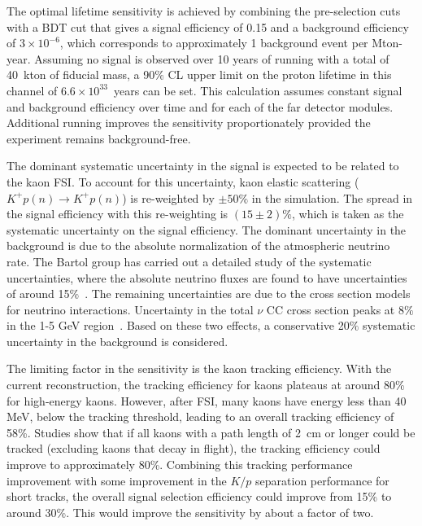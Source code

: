 The optimal lifetime sensitivity is achieved by combining the pre-selection cuts with a BDT cut that gives a signal efficiency of 0.15 and a background efficiency of $3\times 10^{-6}$, which corresponds to approximately 1 background event per Mton-year. Assuming no signal is observed over 10 years of running with a total of 40~kton of fiducial mass, a 90$\%$ CL upper limit on the proton lifetime in this channel of $6.6\times10^{33}$~years can be set. This calculation assumes constant signal and background efficiency over time and for each of the far detector modules.  Additional running improves the sensitivity proportionately provided the experiment remains background-free.

The dominant systematic uncertainty in the signal is expected to be related to the kaon FSI. To account for this uncertainty, kaon elastic scattering ($K^{+}p(n)\rightarrow K^{+}p(n)$) is re-weighted by $\pm 50\%$ in the simulation. The spread in the signal efficiency with this re-weighting is $(15\pm 2)\%$, which is taken as the  systematic uncertainty on the signal efficiency.
The dominant uncertainty in the background 
is due to the absolute normalization of the atmospheric neutrino rate. The Bartol group has carried out a detailed study of the systematic uncertainties, where the absolute neutrino fluxes are found to have uncertainties of around 15$\%$~\cite{Barr:2006it}.
The remaining uncertainties are due to the cross section models for neutrino interactions. Uncertainty in the total $\nu$ CC cross section peaks at 8$\%$ in the 1-5 GeV region~\cite{Adamson:2012gt}.
Based on these two effects, a conservative 20$\%$ systematic uncertainty in the background is considered.

The limiting factor in the sensitivity is the kaon tracking efficiency.  With the current reconstruction, the tracking efficiency for kaons plateaus at around 80\% for high-energy kaons.  However, after FSI, many kaons have energy less than 40 MeV, below the tracking threshold, leading to an overall tracking efficiency of 58\%.
Studies show that if all kaons with a path length of 2~cm or longer could be tracked (excluding kaons that decay in flight), the tracking efficiency could improve to approximately 80\%.  Combining this tracking performance improvement with some improvement in the $K/p$ separation performance for short tracks, the overall signal selection efficiency could improve from 15\% to around 30\%.  This would improve the sensitivity by about a factor of two.  


